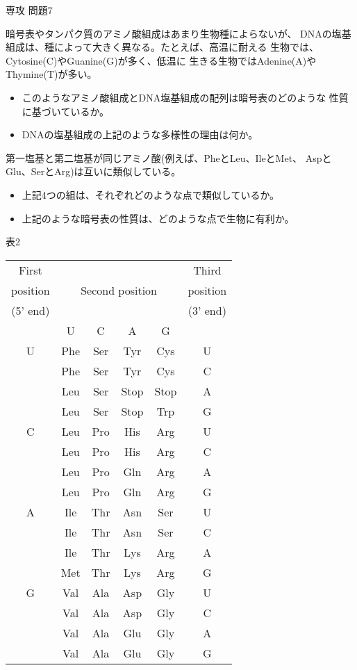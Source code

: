 \documentclass[fleqn]{jbook}
\begin{document}
\begin{question}{専攻 問題7}{}
\begin{subquestions}
  \parbox[t]{80mm}{
  \begin{subsubquestions}
  \SubSubQuestion
    暗号表やタンパク質のアミノ酸組成はあまり生物種によらないが、
    DNAの塩基組成は、種によって大きく異なる。たとえば、高温に耐える
    生物では、\mbox{Cytosine(C)}や\mbox{Guanine(G)}が多く、低温に
    生きる生物では\mbox{Adenine(A)}や\mbox{Thymine(T)}が多い。

    \begin{itemize}
    \item このようなアミノ酸組成とDNA塩基組成の配列は暗号表のどのような
          性質に基づいているか。
    \item DNAの塩基組成の上記のような多様性の理由は何か。
    \end{itemize}

  \SubSubQuestion
    第一塩基と第二塩基が同じアミノ酸(例えば、PheとLeu、IleとMet、
    AspとGlu、SerとArg)は互いに類似している。

    \begin{itemize}
    \item 上記4つの組は、それぞれどのような点で類似しているか。
    \item 上記のような暗号表の性質は、どのような点で生物に有利か。
    \end{itemize}

  \end{subsubquestions}
  }\parbox[t]{78mm}{
  \begin{center}\small
    表2\\\begin{tabular}{|c|c|c|c|c|c|}\hline
      First&\multicolumn{4}{|c|}{}&Third \\ 
      position&\multicolumn{4}{|c|}{Second position}&position \\
      (5' end)&\multicolumn{4}{|c|}{}&(3' end) \\ \hline
      &U&C&A&G& \\ \cline{2-5}
      U&Phe&Ser&Tyr&Cys&U \\
      &Phe&Ser&Tyr&Cys&C\\
      &Leu&Ser&Stop&Stop&A\\
      &Leu&Ser&Stop&Trp&G\\ \hline
      C&Leu&Pro&His&Arg&U\\
      &Leu&Pro&His&Arg&C\\
      &Leu&Pro&Gln&Arg&A\\
      &Leu&Pro&Gln&Arg&G\\ \hline
      A&Ile&Thr&Asn&Ser&U\\
      &Ile&Thr&Asn&Ser&C\\
      &Ile&Thr&Lys&Arg&A\\
      &Met&Thr&Lys&Arg&G\\ \hline
      G&Val&Ala&Asp&Gly&U\\
      &Val&Ala&Asp&Gly&C\\
      &Val&Ala&Glu&Gly&A\\
      &Val&Ala&Glu&Gly&G\\ \hline
    \end{tabular}
  \end{center}}


\end{subquestions}
\end{question}
\end{document}
